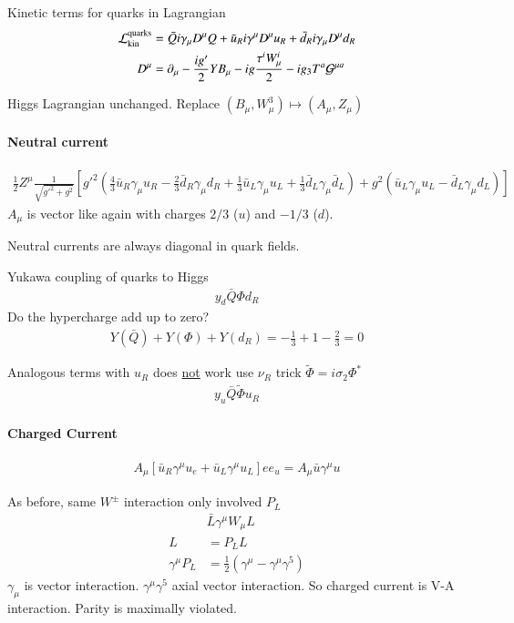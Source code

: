 Kinetic terms for quarks in Lagrangian 
\begin{align}
   \mathcal{L}_\text{kin}^\text{quarks} &= \bar{Q} i \gamma_\mu D^\mu Q + \bar{u}_R i \gamma^\mu D^\mu u_R + \bar{d}_R i \gamma_\mu D^\mu d_R \\
   D^\mu &= \partial_\mu - \frac{ig'}{2}YB_\mu - ig \frac{\tau^i W_\mu^i}{2} - ig_3 T^a \mathcal{G}^{\mu a}
\end{align}

Higgs Lagrangian unchanged. Replace $(B_\mu, W_\mu^3) \mapsto (A_\mu, Z_\mu)$

\paragraph{Neutral current}
\begin{align}
   \frac{1}{2} Z^\mu \frac{1}{\sqrt{g'^2 + g^2}} \left[ g'^2 \left( \frac{4}{3} \bar{u}_R \gamma_\mu u_R - \frac{2}{3}\bar{d}_R \gamma_\mu d_R + \frac{1}{3} \bar{u}_L \gamma_\mu u_L + \frac{1}{3} \bar{d}_L \gamma_\mu \bar{d}_L \right) + g^2 \left( \bar{u}_L \gamma_\mu u_L - \bar{d}_L \gamma_\mu d_L \right) \right]
\end{align}
$A_\mu$ is vector like again with charges $2/3$ ($u$) and $-1/3$ ($d$).

Neutral currents are always diagonal in quark fields. 

Yukawa coupling of quarks to Higgs
\begin{align*}
   y_d \bar{Q} \Phi d_R
\end{align*}
Do the hypercharge add up to zero?
\begin{align*}
   Y(\bar{Q}) + Y(\Phi) + Y(d_R) = -\frac{1}{3} + 1 - \frac{2}{3} = 0
\end{align*}

Analogous terms with $u_R$ does \underline{not} work use $\nu_R$ trick $\tilde{\Phi} = i\sigma_2 \Phi^*$
\begin{align*}
   y_u \bar{Q} \tilde{\Phi} u_R
\end{align*}

\paragraph{Charged Current}

\begin{align}
   A_\mu \left[ \bar{u}_R \gamma^\mu u_e + \bar{u}_L \gamma^\mu u_L \right] e e_u = A_\mu \bar{u} \gamma^\mu u
\end{align}

As before, same $W^\pm$ interaction only involved $P_L$
\begin{align*}
   & \bar{L} \gamma^\mu W_\mu L \\
   L &= P_L L \\
   \gamma^\mu P_L &= \frac{1}{2} \left( \gamma^\mu - \gamma^\mu \gamma^5 \right)
\end{align*}
$\gamma_\mu$ is vector interaction. $\gamma^\mu \gamma^5$ axial vector interaction. 
So charged current is V-A interaction. Parity is maximally violated.

